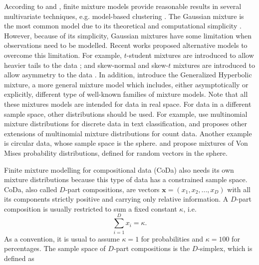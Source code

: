 \documentclass[10pt, a4paper]{article}
\begin{document}
According to \cite{scott1971clustering} and \cite{mclachlan2004finite}, finite mixture models provide reasonable results in several multivariate techniques, e.g. model-based clustering  \citep{banfield1993model,  fraley2002model}. The Gaussian mixture is the most common model 
due to its theoretical and computational simplicity \citep{mclachlan2004finite}. 
However, because of its simplicity, Gaussian mixtures have some limitation when observations need to be modelled.
%
%
%
Recent works  proposed alternative models to overcome this limitation. For example, $t$-student mixtures are introduced to allow heavier tails to the data \citep{andrews2012model, lee2013finite, lin2010robust}; and skew-normal and skew-$t$ mixtures are introduced to allow asymmetry to the data \citep{lee2011fitting}. In addition, \cite{browne2013mixture} introduce the Generalized Hyperbolic mixture, a more general mixture model which includes, either asymptotically or explicitly, different type of well-known families of mixture models. Note that all these mixtures models are intended for data in real space. For data in a different sample space, other distributions should be used. 
For example, \cite{bickel2004multi} use multinomial mixture distributions for discrete data in text classification, and  
 \cite[][]{bouguila2011count} proposes other extensions of multinomial mixture distributions for count data. 
Another example is circular data, whose sample space is the sphere.  \cite{banerjee2005clustering} and \cite{mardia2007protein} propose mixtures of Von Mises probability distributions, defined for random vectors in the sphere.

Finite mixture modelling for compositional data (CoDa) also needs its own mixture distributions because this type of data has a constrained sample space.
CoDa, also called $D$-part compositions, are vectors $\textbf{x} = (x_1, x_2, ..., x_D)$ with all its components strictly positive  and carrying only relative information. A $D$-part composition is usually restricted to sum a fixed constant $\kappa$, i.e.
\begin{equation}
\sum_{i=1 }^D x_i = \kappa.
\label{sum_to_constant}
\end{equation}
As a convention, it is usual to assume $\kappa =1$ for probabilities and $\kappa = 100$ for percentages. The sample space of $D$-part compositions is the $D$-simplex, which is defined as
\end{document}
